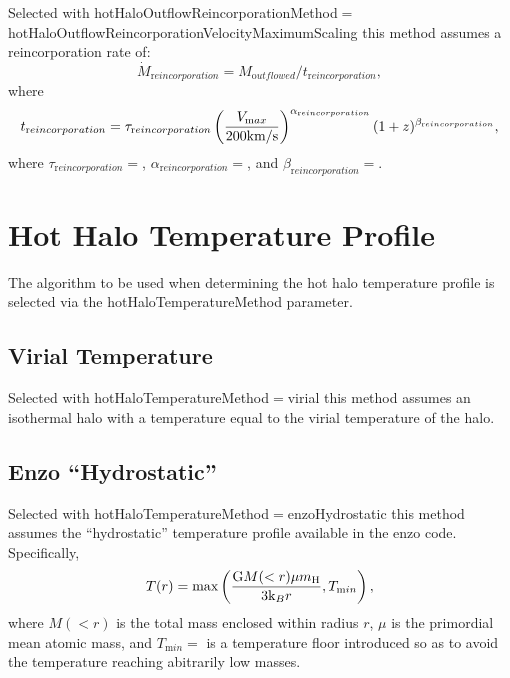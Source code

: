 Selected with {\normalfont \ttfamily hotHaloOutflowReincorporationMethod}$=${\normalfont \ttfamily hotHaloOutflowReincorporationVelocityMaximumScaling} this method assumes a reincorporation rate of:
\begin{equation}
 \dot{M}_{\mathrm reincorporation} = M_{\mathrm outflowed} / t_{\mathrm reincorporation},
\end{equation}
where
\begin{equation}
 t_{\mathrm reincorporation} = \tau_{\mathrm reincorporation} \left( { V_{\mathrm max} \over 200 \hbox{km/s}} \right)^{\alpha_{\mathrm reincorporation}} (1+z)^{\beta_{\mathrm reincorporation}},
\end{equation}
where $\tau_{\mathrm reincorporation}=${\normalfont \ttfamily [hotHaloOutflowReincorporationVlctyMxSclngTimeScale]}, $\alpha_{\mathrm reincorporation}=${\normalfont \ttfamily [hotHaloOutflowReincorporationVlctyMxSclngVelocityExponent]}, and $\beta_{\mathrm reincorporation}=${\normalfont \ttfamily [hotHaloOutflowReincorporationVlctyMxSclngRedshiftExponent]}.

\section{Hot Halo Temperature Profile}\label{sec:HotHaloTemperature}

The algorithm to be used when determining the hot halo temperature profile is selected via the {\normalfont \ttfamily hotHaloTemperatureMethod} parameter.

\subsection{Virial Temperature}\label{phys:hotHaloTemperatureProfile:hotHaloTemperatureProfileVirial}

Selected with {\normalfont \ttfamily hotHaloTemperatureMethod}$=${\normalfont \ttfamily virial} this method assumes an isothermal halo with a temperature equal to the virial temperature of the halo.

\subsection{Enzo ``Hydrostatic''}\label{phys:hotHaloTemperatureProfile:hotHaloTemperatureProfileEnzoHydrostatic}

Selected with {\normalfont \ttfamily hotHaloTemperatureMethod}$=${\normalfont \ttfamily enzoHydrostatic} this method assumes the ``hydrostatic'' temperature profile available in the \gls{enzo} code. Specifically,
\begin{equation}
  T(r) = \hbox{max}\left( {{\mathrm G} M(<r) \mu m_{\mathrm H} \over 3 {\mathrm k_B} r} , T_{\mathrm min} \right),
\end{equation}
where $M(<r)$ is the total mass enclosed within radius $r$, $\mu$ is the primordial mean atomic mass, and $T_{\mathrm min}=${\normalfont \ttfamily [enzoHydrostaticTemperatureMinimum]} is a temperature floor introduced so as to avoid the temperature reaching abitrarily low masses. 

